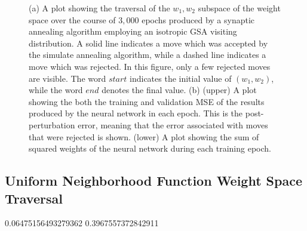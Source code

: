 \documentclass[11pt]{afthesis}
\begin{document}
\begin{figure}[ht!]
{   			(a) A plot showing the traversal of the $w_1,w_2$ subspace of the weight space over the course of $3,000$ epochs produced by a synaptic annealing algorithm employing an isotropic GSA visiting distribution. A solid line indicates a move which was accepted by the simulate annealing algorithm, while a dashed line indicates a move which was rejected. In this figure, only a few rejected moves are visible. The word $start$ indicates the initial value of $(w_1,w_2)$, while the word $end$ denotes the final value. 
   			(b) (upper) A plot showing the both the training and validation MSE of the results produced by the neural network in each epoch. This is the post-perturbation error, meaning that the error associated with moves that were rejected is shown. (lower) A plot showing the sum of squared weights of the neural network during each training epoch.}
   		\label{fig:weight_space_gsa_i}
   		
   	\end{figure}
	   	
	
	\subsection{Uniform Neighborhood Function Weight Space Traversal} 
	
	0.06475156493279362 0.3967557372842911
\end{document}
